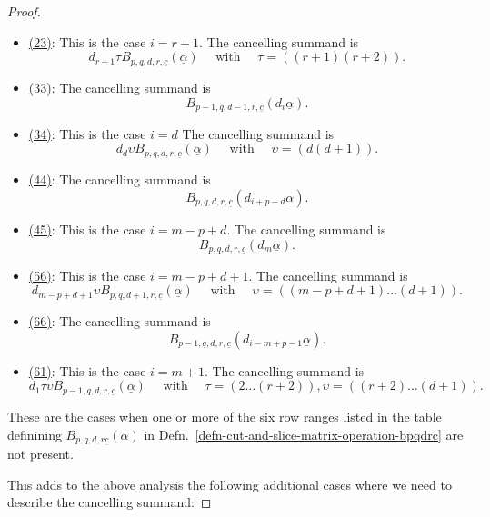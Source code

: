 \documentclass[12pt,a4paper,reqno]{amsart}
\begin{document}
\begin{proof}
\begin{itemize}
\item \underline{(23)}: This is the case $i = r+1$. 
The cancelling summand is 
$$ d_{r+1} \tau B_{p, q, d, r,\underline{c}} (\underline{\alpha})
\quad \text{ with } \quad \tau = \left((r+1)(r+2)\right). $$

\item \underline{(33)}: The cancelling summand is 
$$ B_{p-1, q, d-1, r, \underline{c}} (d_i \underline{\alpha}). $$

\item \underline{(34)}: This is the case $i=d$ The cancelling summand is 
$$ d_d \upsilon B_{p, q, d, r, \underline{c}} (\underline{\alpha})
\quad \text{ with } \quad \upsilon = \left(d(d+1)\right). $$

\item \underline{(44)}: The cancelling summand is 
$$ B_{p, q, d, r, \underline{c}} (d_{i + p - d} \underline{\alpha}).$$

\item \underline{(45)}: This is the case $i = m-p+d$. 
The cancelling summand is 
$$ B_{p, q, d, r, \underline{c}} (d_{m} \underline{\alpha}).$$

\item \underline{(56)}: This is the case $i = m-p+d+1$. 
The cancelling summand is 
$$ d_{m-p+d+1} \upsilon B_{p, q, d+1, r, \underline{c}} (\underline{\alpha})
\quad \text{ with } \quad \upsilon = \left((m-p+d+1)\dots(d+1)\right). $$

\item \underline{(66)}: The cancelling summand is 
$$ B_{p-1, q, d, r, \underline{c}} (d_{i-m+p-1} \underline{\alpha}).$$

\item \underline{(61)}: This is the case $i = m+1$. 
The cancelling summand is 
$$ d_1 \tau \upsilon B_{p-1, q, d, r, \underline{c}} (\underline{\alpha})
\quad \text{ with } \quad 
\tau = \left(2\dots(r+2)\right),
\upsilon = \left((r+2)\dots(d+1)\right). $$
\end{itemize}


These are the cases when one or more of the six row
ranges listed in the table definining $B_{p, q, d, r
\underline{c}}(\underline{\alpha})$ in
Defn.~\ref{defn-cut-and-slice-matrix-operation-bpqdrc} are not
present. 

This adds to the above analysis the following additional cases 
where we need to describe the cancelling summand: 


\end{proof}
\end{document}

